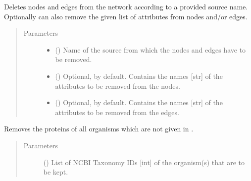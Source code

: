 \documentclass[letterpaper,10pt,english]{sphinxmanual}
\begin{document}
\begin{fulllineitems}
\begin{fulllineitems}
\end{fulllineitems}


\begin{fulllineitems}
\label{\detokenize{main:pypath.main.PyPath.delete_by_source}}
Deletes nodes and edges from the network according to a provided
source name. Optionally can also remove the given list of
attributes from nodes and/or edges.
\begin{quote}\begin{description}
\item[{Parameters}] \leavevmode\begin{itemize}
\item {} 
 () \textendash{} Name of the source from which the nodes and edges have to be
removed.

\item {} 
 () \textendash{} Optional,  by default. Contains the names {[}str{]} of
the attributes to be removed from the nodes.

\item {} 
 () \textendash{} Optional,  by default. Contains the names {[}str{]} of
the attributes to be removed from the edges.

\end{itemize}

\end{description}\end{quote}

\end{fulllineitems}


\begin{fulllineitems}
\label{\detokenize{main:pypath.main.PyPath.delete_by_taxon}}
Removes the proteins of all organisms which are not given in
.
\begin{quote}\begin{description}
\item[{Parameters}] \leavevmode
{} () \textendash{} List of NCBI Taxonomy IDs {[}int{]} of the organism(s) that are
to be kept.


\end{description}
\end{quote}
\end{fulllineitems}
\end{fulllineitems}
\end{document}
